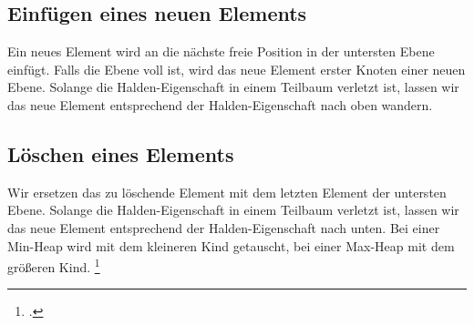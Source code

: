\documentclass{lehramt-informatik-haupt}
\begin{document}
%

\subsection{Einfügen eines neuen Elements}

Ein neues Element wird an die nächste freie Position in der untersten
Ebene einfügt. Falls die Ebene voll ist, wird das neue Element erster
Knoten einer neuen Ebene. Solange die Halden-Eigenschaft in einem
Teilbaum verletzt ist, lassen wir das neue Element entsprechend der
Halden-Eigenschaft nach oben wandern.

%

\subsection{Löschen eines Elements}

Wir ersetzen das zu löschende Element mit dem letzten Element der
untersten Ebene.
%
Solange die Halden-Eigenschaft in einem Teilbaum verletzt ist, lassen
wir das neue Element entsprechend der Halden-Eigenschaft nach unten.
%
Bei einer Min-Heap wird mit dem kleineren Kind getauscht, bei einer
Max-Heap mit dem größeren Kind.
\footcite[Seite 28]{aud:fs:tafeluebung-11}

\literatur
\end{document}
